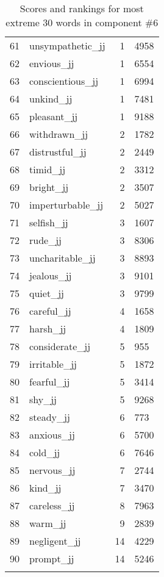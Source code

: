 \begin{longtable}[!htbp]{| rlr@{.}l |}
    61 & unsympathetic\_jj & 1 & 4958 \\
    62 & envious\_jj & 1 & 6554 \\
    63 & conscientious\_jj & 1 & 6994 \\
    64 & unkind\_jj & 1 & 7481 \\
    65 & pleasant\_jj & 1 & 9188 \\
    66 & withdrawn\_jj & 2 & 1782 \\
    67 & distrustful\_jj & 2 & 2449 \\
    68 & timid\_jj & 2 & 3312 \\
    69 & bright\_jj & 2 & 3507 \\
    70 & imperturbable\_jj & 2 & 5027 \\
    71 & selfish\_jj & 3 & 1607 \\
    72 & rude\_jj & 3 & 8306 \\
    73 & uncharitable\_jj & 3 & 8893 \\
    74 & jealous\_jj & 3 & 9101 \\
    75 & quiet\_jj & 3 & 9799 \\
    76 & careful\_jj & 4 & 1658 \\
    77 & harsh\_jj & 4 & 1809 \\
    78 & considerate\_jj & 5 & 955 \\
    79 & irritable\_jj & 5 & 1872 \\
    80 & fearful\_jj & 5 & 3414 \\
    81 & shy\_jj & 5 & 9268 \\
    82 & steady\_jj & 6 & 773 \\
    83 & anxious\_jj & 6 & 5700 \\
    84 & cold\_jj & 6 & 7646 \\
    85 & nervous\_jj & 7 & 2744 \\
    86 & kind\_jj & 7 & 3470 \\
    87 & careless\_jj & 8 & 7963 \\
    88 & warm\_jj & 9 & 2839 \\
    89 & negligent\_jj & 14 & 4229 \\
    90 & prompt\_jj & 14 & 5246 \\
    \hline
    \caption{Scores and rankings for most extreme 30 words in component \#6} \\
\end{longtable}
